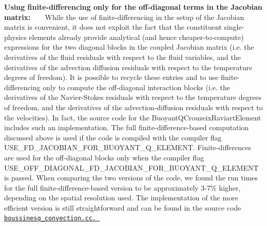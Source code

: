 \begin{DoxyItemize}
\begin{DoxyEnumerate}
\item {\bfseries Using finite-\/differencing only for the off-\/diagonal terms in the Jacobian matrix\+:} ~\newline
~\newline
 While the use of finite-\/differencing in the setup of the Jacobian matrix is convenient, it does not exploit the fact that the constituent single-\/physics elements already provide analytical (and hence cheaper-\/to-\/compute) expressions for the two diagonal blocks in the coupled Jacobian matrix (i.\+e. the derivatives of the fluid residuals with respect to the fluid variables, and the derivatives of the advection diffusion residuals with respect to the temperature degrees of freedom). It is possible to recycle these entries and to use finite-\/differencing only to compute the off-\/diagonal interaction blocks (i.\+e. the derivatives of the Navier-\/\+Stokes residuals with respect to the temperature degrees of freedom, and the derivatives of the advection-\/diffusion residuals with respect to the velocities). In fact, the source code for the {\ttfamily Buoyant\+Q\+Crouzeix\+Raviart\+Element} includes such an implementation. The full finite-\/difference-\/based computation discussed above is used if the code is compiled with the compiler flag {\ttfamily U\+S\+E\+\_\+\+F\+D\+\_\+\+J\+A\+C\+O\+B\+I\+A\+N\+\_\+\+F\+O\+R\+\_\+\+B\+U\+O\+Y\+A\+N\+T\+\_\+\+Q\+\_\+\+E\+L\+E\+M\+E\+NT}. Finite-\/differences are used for the off-\/diagonal blocks only when the compiler flag {\ttfamily U\+S\+E\+\_\+\+O\+F\+F\+\_\+\+D\+I\+A\+G\+O\+N\+A\+L\+\_\+\+F\+D\+\_\+\+J\+A\+C\+O\+B\+I\+A\+N\+\_\+\+F\+O\+R\+\_\+\+B\+U\+O\+Y\+A\+N\+T\+\_\+\+Q\+\_\+\+E\+L\+E\+M\+E\+NT} is passed. When comparing the two versions of the code, we found the run times for the full finite-\/difference-\/based version to be approximately 3-\/7\% higher, depending on the spatial resolution used. The implementation of the more efficient version is still straightforward and can be found in the source code \href{../../../../demo_drivers/multi_physics/boussinesq_convection/boussinesq_convection.cc}{\tt boussinesq\+\_\+convection.\+cc. } ~\newline
~\newline


\end{DoxyEnumerate}
\end{DoxyItemize}
